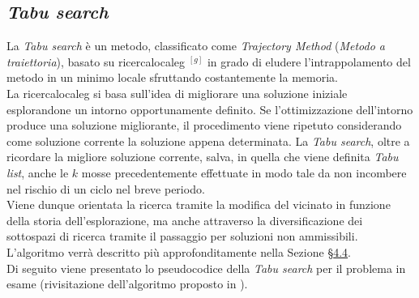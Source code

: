 \subsection{\textit{Tabu search}}
\noindent La \textit{Tabu search} \cite{siteS:dispense-de-giovanni} è un metodo, classificato come \textit{Trajectory Method} (\textit{Metodo a traiettoria}), basato su \gls{ricercalocaleg} $^{[g]}$
in grado di eludere l'intrappolamento del metodo in un minimo locale sfruttando costantemente la memoria.\\
La \gls{ricercalocaleg} si basa sull’idea di migliorare
una soluzione iniziale esplorandone un intorno
opportunamente definito. Se l’ottimizzazione
dell’intorno produce una soluzione migliorante,
il procedimento viene ripetuto
considerando come soluzione corrente la soluzione
appena determinata.
La \textit{Tabu search}, oltre a ricordare la migliore soluzione corrente, salva, in quella che viene definita \textit{Tabu list},
anche le {$k$} mosse precedentemente effettuate in modo tale da non incombere nel rischio di un ciclo nel breve periodo.\\
Viene dunque orientata la ricerca tramite la modifica del vicinato in funzione della storia dell'esplorazione, ma anche attraverso la diversificazione dei sottospazi
di ricerca tramite il passaggio per soluzioni non ammissibili.
L'algoritmo verrà descritto più approfonditamente nella Sezione §\hyperref[sec:tabu-search]{4.4}.\\
Di seguito viene presentato lo pseudocodice della \textit{Tabu search} per il problema in esame (rivisitazione dell'algoritmo proposto in \cite{siteO:solid-github}).\\
